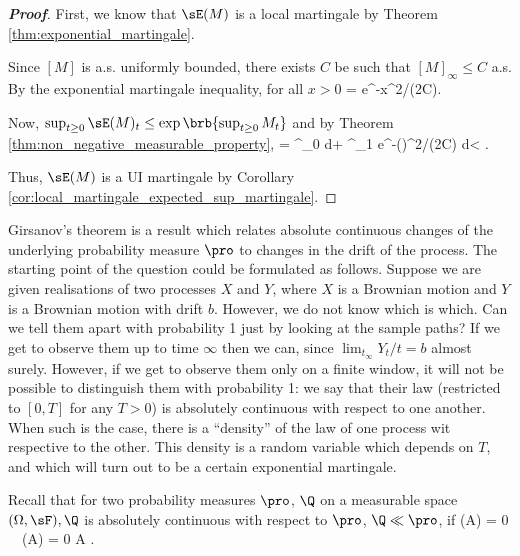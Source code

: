 \begin{proof}[\bf Proof]
First, we know that $\sE(M)$ is a local martingale by Theorem \ref{thm:exponential_martingale}.

Since $[M]$ is a.s. uniformly bounded, there exists $C$ be such that $[M]_\infty \leq C$ a.s. By the exponential martingale inequality, for all $x > 0$
\be
\pro{} = \pro{} \leq e^{-x^2/(2C)}.
\ee

Now, $\sup_{t\geq0} \sE(M)_t \leq \exp\brb{\sup_{t\geq0} M_t}$ and by Theorem \ref{thm:non_negative_measurable_property},
\be
\E{} \leq \E{} = \int^\infty_0 \pro{}d\lm {}+ \int^\infty_1 e^{-(\log \lm)^2/(2C)} d\lm < \infty.
\ee

Thus, $\sE(M)$ is a UI martingale by Corollary \ref{cor:local_martingale_expected_sup_martingale}. %
\end{proof}

Girsanov's theorem is a result which relates absolute continuous changes of the underlying probability measure $\pro$ to changes in the drift of the process.
The starting point of the question could be formulated as follows. Suppose we are given realisations of two processes $X$ and $Y$, where $X$ is a Brownian motion and $Y$ is a Brownian motion with drift $b$.
However, we do not know which is which. Can we tell them apart with probability 1 just by looking at the sample paths? If we get to observe them up to time $\infty$ then we can,
since $\lim_{t_\infty} Y_t/t = b$ almost surely. However, if we get to observe them only on a finite window, it will not be possible to distinguish them with probability 1:
we say that their law (restricted to $[0, T]$ for any $T > 0$) is absolutely continuous with respect to one another. When such is the case, there is a ``density'' of the law of one process wit respective to the other.
This density is a random variable which depends on $T$, and which will turn out to be a certain exponential martingale.

Recall that for two probability measures $\pro$, $\Q$ on a measurable space $(\Omega,\sF), \Q$ is absolutely continuous with respect to $\pro$, $\Q \ll \pro$, if
\be
\pro(A) = 0 \ \ra\ \Q(A) = 0 \quad{}A \in \sF.
\ee


